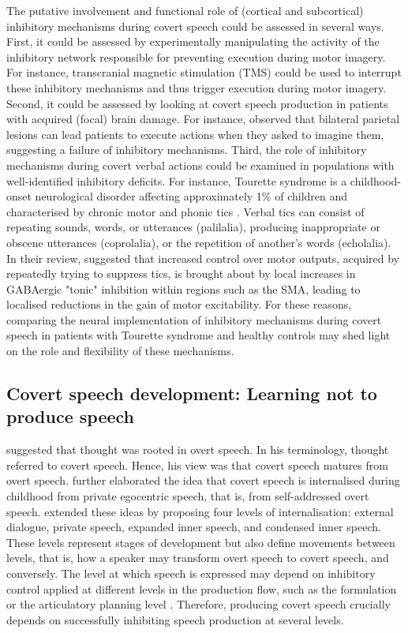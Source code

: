 \documentclass[utf8]{template/frontiersSCNS} %
\begin{document}
The putative involvement and functional role of (cortical and subcortical) inhibitory mechanisms during covert speech could be assessed in several ways. First, it could be assessed by experimentally manipulating the activity of the inhibitory network responsible for preventing execution during motor imagery. For instance, transcranial magnetic stimulation (TMS) could be used to interrupt these inhibitory mechanisms and thus trigger execution during motor imagery. Second, it could be assessed by looking at covert speech production in patients with acquired (focal) brain damage. For instance, \cite{schwoebel_man_2002} observed that bilateral parietal lesions can lead patients to execute actions when they asked to imagine them, suggesting a failure of inhibitory mechanisms. Third, the role of inhibitory mechanisms during covert verbal actions could be examined in populations with well-identified inhibitory deficits. For instance, Tourette syndrome is a childhood-onset neurological disorder affecting approximately 1\% of children and characterised by chronic motor and phonic tics \citep{jackson_inhibition_2015}. Verbal tics can consist of repeating sounds, words, or utterances (palilalia), producing inappropriate or obscene utterances (coprolalia), or the repetition of another’s words (echolalia). In their review, \cite{jackson_inhibition_2015} suggested that increased control over motor outputs, acquired by repeatedly trying to suppress tics, is brought about by local increases in GABAergic "tonic" inhibition within regions such as the SMA, leading to localised reductions in the gain of motor excitability. For these reasons, comparing the neural implementation of inhibitory mechanisms during covert speech in patients with Tourette syndrome and healthy controls may shed light on the role and flexibility of these mechanisms.

\subsection{Covert speech development: Learning not to produce speech}

\cite{watson_psychology_1919} suggested that thought was rooted in overt speech. In his terminology, thought referred to covert speech. Hence, his view was that covert speech matures from overt speech. \cite{vygotsky_thought_1934} further elaborated the idea that covert speech is internalised during childhood from private egocentric speech, that is, from self-addressed overt speech. \cite{fernyhough_alien_2004} extended these ideas by proposing four levels of internalisation: external dialogue, private speech, expanded inner speech, and condensed inner speech. These levels represent stages of development but also define movements between levels, that is, how a speaker may transform overt speech to covert speech, and conversely. The level at which speech is expressed may depend on inhibitory control applied at different levels in the production flow, such as the formulation or the articulatory planning level \citep{grandchamp_condialint_2019}. Therefore, producing covert speech crucially depends on successfully inhibiting speech production at several levels. 
\end{document}
